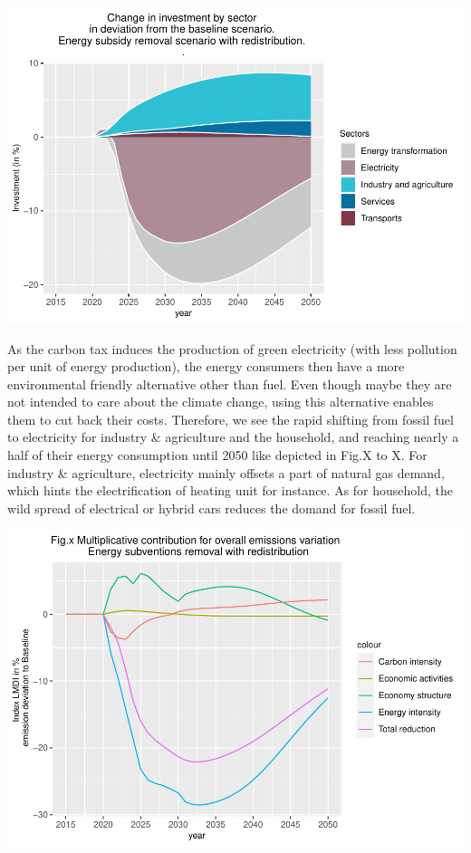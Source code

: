 \documentclass[
]{article}
\begin{document}
\begin{center}\includegraphics[width=0.7\linewidth,height=0.7\textheight]{Modele-ThreeMe-Tunisie_Sequeira_Valilou_Wang_files/figure-latex/unnamed-chunk-26-1} \end{center}

As the carbon tax induces the production of green electricity (with less
pollution per unit of energy production), the energy consumers then have
a more environmental friendly alternative other than fuel. Even though
maybe they are not intended to care about the climate change, using this
alternative enables them to cut back their costs. Therefore, we see the
rapid shifting from fossil fuel to electricity for industry \&
agriculture and the household, and reaching nearly a half of their
energy consumption until 2050 like depicted in Fig.X to X. For industry
\& agriculture, electricity mainly offsets a part of natural gas demand,
which hints the electrification of heating unit for instance. As for
household, the wild spread of electrical or hybrid cars reduces the
domand for fossil fuel.

\begin{center}\includegraphics[width=0.7\linewidth,height=0.7\textheight]{Modele-ThreeMe-Tunisie_Sequeira_Valilou_Wang_files/figure-latex/unnamed-chunk-27-1} \end{center}
\end{document}
